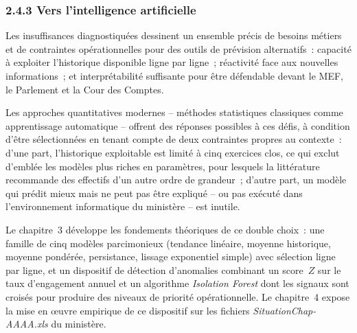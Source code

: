 \subsubsection*{2.4.3 \quad Vers l'intelligence artificielle}

Les insuffisances diagnostiqu\'ees dessinent un ensemble pr\'ecis de besoins m\'etiers et de contraintes op\'erationnelles pour des outils de pr\'evision alternatifs~: capacit\'e \`a exploiter l'historique disponible ligne par ligne~; r\'eactivit\'e face aux nouvelles informations~; et interpr\'etabilit\'e suffisante pour \^etre d\'efendable devant le MEF, le Parlement et la Cour des Comptes.

Les approches quantitatives modernes -- m\'ethodes statistiques classiques \citep{Hyndman2021} comme apprentissage automatique \citep{Russell2020} -- offrent des r\'eponses possibles \`a ces d\'efis, \`a condition d'\^etre s\'electionn\'ees en tenant compte de deux contraintes propres au contexte~: d'une part, l'historique exploitable est limit\'e \`a cinq exercices clos, ce qui exclut d'embl\'ee les mod\`eles plus riches en param\`etres, pour lesquels la litt\'erature recommande des effectifs d'un autre ordre de grandeur~; d'autre part, un mod\`ele qui pr\'edit mieux mais ne peut pas \^etre expliqu\'e -- ou pas ex\'ecut\'e dans l'environnement informatique du minist\`ere -- est inutile.

Le chapitre~3 d\'eveloppe les fondements th\'eoriques de ce double choix~: une famille de cinq mod\`eles parcimonieux (tendance lin\'eaire, moyenne historique, moyenne pond\'er\'ee, persistance, lissage exponentiel simple) avec s\'election ligne par ligne, et un dispositif de d\'etection d'anomalies combinant un score~$Z$ sur le taux d'engagement annuel et un algorithme \textit{Isolation Forest} dont les signaux sont crois\'es pour produire des niveaux de priorit\'e op\'erationnelle. Le chapitre~4 expose la mise en \oe{}uvre empirique de ce dispositif sur les fichiers \textit{SituationChap-AAAA.xls} du minist\`ere.
